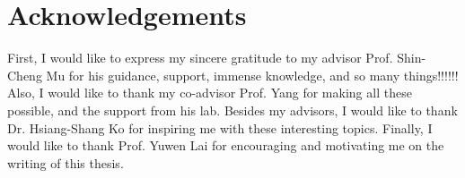 \documentclass[\main/thesis.tex]{subfiles}
\begin{document}
\chapter*{Acknowledgements}
First, I would like to express my sincere gratitude to my advisor Prof.
Shin-Cheng Mu  for his guidance, support, immense knowledge, and so many things!!!!!!
Also, I would like to thank my co-advisor Prof. Yang for making all these
possible, and the support from his lab.
Besides my advisors, I would like to thank Dr. Hsiang-Shang Ko for inspiring me
with these interesting topics.
Finally, I would like to thank Prof. Yuwen Lai for encouraging and motivating me
on the writing of this thesis.
\end{document}
